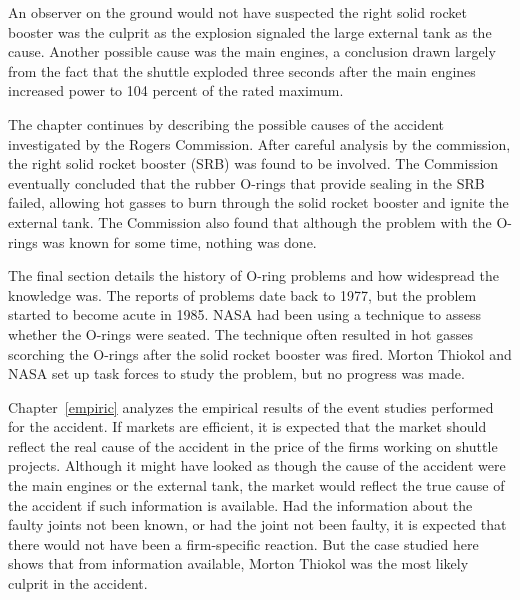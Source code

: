 An observer on the ground would not have suspected the right solid rocket booster was the culprit as the explosion signaled the large external tank as the cause. Another possible cause was the main engines, a conclusion drawn largely from the fact that the shuttle exploded three seconds after the main engines increased power to 104 percent of the rated maximum.

The chapter continues by describing the possible causes of the accident investigated by the Rogers Commission. After careful analysis by the commission, the right solid rocket booster (SRB) was found to be involved. The Commission eventually concluded that the rubber O-rings that provide sealing in the SRB failed, allowing hot gasses to burn through the solid rocket booster and ignite the external tank. The Commission also found that although the problem with the O-rings was known for some time, nothing was done.

The final section details the history of O-ring problems and how widespread the knowledge was. The reports of problems date back to 1977, but the problem started to become acute in 1985. NASA had been using a technique to assess whether the O-rings were seated. The technique often resulted in hot gasses scorching the O-rings after the solid rocket booster was fired. Morton Thiokol and NASA set up task forces to study the problem, but no progress was made.

Chapter~\ref{empiric} analyzes the empirical results of the event studies performed for the accident. If markets are efficient, it is expected that the market should reflect the real cause of the accident in the price of the firms working on shuttle projects. Although it might have looked as though the cause of the accident were the main engines or the external tank, the market would reflect the true cause of the accident if such information is available. Had the information about the faulty joints not been known, or had the joint not been faulty, it is expected that there would not have been a firm-specific reaction. But the case studied here shows that from information available, Morton Thiokol was the most likely culprit in the accident.